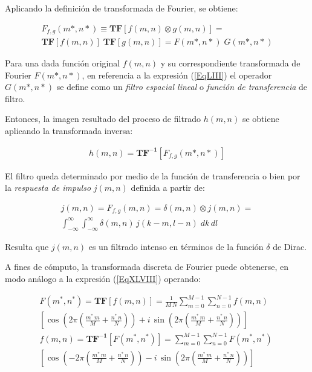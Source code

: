 Aplicando la definici\'on de transformada de Fourier, se obtiene:

\begin{eqnarray}
	F_{f, g}(m*, n*) \equiv \mathbf{TF} [ f(m, n) \otimes g(m, n) ] =  \nonumber \\
	\mathbf{TF} [ f(m, n)] \; \mathbf{TF} [ g(m, n)] = F(m*, n*) \; G(m*, n*)
\label{EqLIII}
\end{eqnarray}

Para una dada funci\'on original $f(m, n)$ y su correspondiente transformada de Fourier $F(m*, n*)$, en referencia a la expresi\'on (\ref{EqLIII}) 
el operador $G(m*, n*)$ se define como un \textit{filtro espacial lineal} o \textit{funci\'on de transferencia} de filtro.
%

%
Entonces, la imagen resultado del proceso de filtrado $h(m, n)$ se obtiene aplicando la transformada inversa:

\begin{eqnarray}
	h(m, n) = \mathbf{TF^{-1}} [F_{f, g}(m*, n*) ]
\label{EqLIV}
\end{eqnarray}

El filtro queda determinado por medio de la funci\'on de transferencia o bien por la \textit{respuesta de impulso} $j(m, n)$ definida a partir de:

\begin{eqnarray}
	j(m, n) = F_{f, g}(m, n) = \delta (m, n) \otimes j(m, n) =  \nonumber \\
	\int_{-\infty}^{\infty} \int_{-\infty}^{\infty} \delta(m, n) \, j(k-m, l-n) \; dk \, dl
\label{EqLV}
\end{eqnarray}

Resulta que $j(m, n)$ es un filtrado intenso en t\'erminos de la funci\'on $\delta$ de Dirac.
%

%
A fines de c\'omputo, la transformada discreta de Fourier puede obtenerse, en modo an\'alogo a la expresi\'on (\ref{EqXLVIII}) operando:

\begin{eqnarray}
	F(m^*, n^*) = \mathbf{TF}[f(m, n)] = \frac{1}{M \, N} \sum_{m=0}^{M-1} \sum_{n=0}^{N-1} f(m, n) \; \nonumber \\
	\left[ \cos \left( 2 \pi  (\frac{m^* \, m}{M} + \frac{n^* \, n}{N}) \right) + 
	i \, \sin \left( 2 \pi  (\frac{m^* \, m}{M} + \frac{n^* \, n}{N}) \right)\right] \nonumber \\
	f(m, n) = \mathbf{TF^{-1}} [F(m^*, n^*)] = \sum_{m=0}^{M-1} \sum_{n=0}^{N-1} F(m^*, n^*) \; \nonumber \\
	\left[ \cos \left( -2 \pi  (\frac{m^* \, m}{M} + \frac{n^* \, n}{N}) \right) - 
	i \, \sin \left( 2 \pi  (\frac{m^* \, m}{M} + \frac{n^* \, n}{N}) \right)\right] \nonumber \\
\label{EqLVI}
\end{eqnarray}

